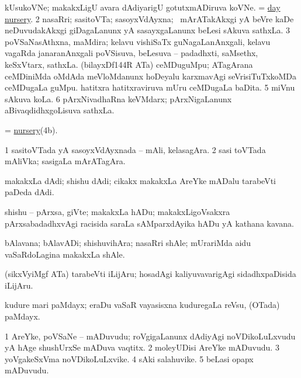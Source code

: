 \bentry
{}
\gl{\nA}
\bmng
\bnum
{} 
\banum
{} kUsukoVNe; makakxLigU avara dAdiyarigU gotutxmADiruva koVNe. 
 = \hyperref{kandict_d.pdf}{D}{day nursery}{day nursery}. 
\eanum
\numie
\num{2} nasaRri; sasitoVTa; sasoyxVdAyxna; \kanmu\ mArATakAkxgi yA beVre kaDe neDuvudakAkxgi giDagaLanunx yA sasayxgaLanunx beLesi sAkuva sathxLa. 
\num{3} poVSaNasAthxna, maMdira; kelavu vishiSaTx guNagaLanAnxgali, kelavu vagaRda janaranAnxgali poVSisuva, beLesuva -- padadhxti, saMsethx, keSxVtarx, sathxLa. 
 (bilayxDf\char144R ATa) 
\banum
{} ceMDuguMpu; ATagArana ceMDiniMda oMdAda meVloMdanunx hoDeyalu karxmavAgi seVrisiTuTxkoMDa ceMDugaLa guMpu. 
\hypertarget{nursery(4b)}{} 
 hatitxra hatitxraviruva mUru ceMDugaLa baDita. 
\eanum
\numie
\num{5} miVnu sAkuva koLa. 
\num{6} pArxNivadhaRna keVMdarx; pArxNigaLanunx aBivaqdidhxgoLisuva sathxLa. 
\enum
\emng

\noindent
\gl{\pagu}
\bmng
{} = \hyperlink{nursery(4b)}{nursery}(4b). 
\emng
\eentry

\bentry
{}
\gl{\nA}
\bmng
\bnum
\num{1} sasitoVTada yA sasoyxVdAyxnada -- mAli, kelasagAra. 
\num{2} sasi toVTada mAliVka; sasigaLa mArATagAra. 
\enum
\emng
\eentry

\bentry
{}
\gl{\nA}
\bmng
makakxLa dAdi; shishu dAdi; cikakx makakxLa AreYke mADalu tarabeVti paDeda dAdi. 
\emng
\eentry

\bentry
{}
\gl{\nA}
\bmng
shishu -- pArxsa, giVte; makakxLa hADu; makakxLigoVsakxra pArxsabadadhxvAgi racisida saraLa sAMparxdAyika hADu yA kathana kavana. 
\emng
\eentry

\bentry
{}
\gl{\nA}
\bmng
bAlavana; bAlavADi; shishuvihAra; nasaRri shAle; mUrariMda aidu vaSaRdoLagina makakxLa shAle. 
\emng
\eentry

\bentry
{}
\gl{\nA}
\bmng
(sikxVyiMgf ATa) tarabeVti iLijAru; hosadAgi kaliyuvavarigAgi sidadhxpaDisida iLijAru. 
\emng
\eentry

\bentry
{}
\gl{\nA}
\bmng
kudure mari paMdayx; eraDu vaSaR vayasisxna kuduregaLa reVsu, (OTada) paMdayx. 
\emng
\eentry

\bentry
{}
\gl{\nA}
\bmng
\bnum
\num{1} AreYke, poVSaNe -- mADuvudu; roVgigaLanunx dAdiyAgi noVDikoLuLxvudu yA hAge shushUrxSe mADuva vaqtitx. 
\num{2} moleyUDisi AreYke mADuvudu. 
\num{3} yoVgakeSxVma noVDikoLuLxvike. 
\num{4} sAki salahuvike. 
\num{5} beLasi opapx mADuvudu. 
\enum
\emng
\eentry

